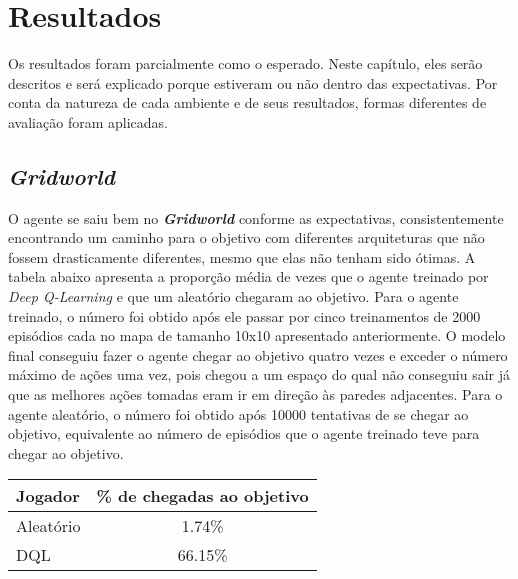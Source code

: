
\chapter{Resultados}
\label{cap:resultados}

Os resultados foram parcialmente como o esperado.
Neste capítulo, eles serão descritos e será explicado porque estiveram ou não dentro das expectativas.
Por conta da natureza de cada ambiente e de seus resultados, formas diferentes de avaliação foram aplicadas.

\section{\textit{Gridworld}}
\label{sec:res_gridworld}

O agente se saiu bem no \textbf{\textit{Gridworld}} conforme as expectativas, consistentemente encontrando um caminho para o objetivo com diferentes arquiteturas que não fossem drasticamente diferentes, mesmo que elas não tenham sido ótimas.
A tabela abaixo apresenta a proporção média de vezes que o agente treinado por \textit{Deep Q-Learning} e que um aleatório chegaram ao objetivo.
Para o agente treinado, o número foi obtido após ele passar por cinco treinamentos de 2000 episódios cada no mapa de tamanho 10x10 apresentado anteriormente.
O modelo final conseguiu fazer o agente chegar ao objetivo quatro vezes e exceder o número máximo de ações uma vez, pois chegou a um espaço do qual não conseguiu sair já que as melhores ações tomadas eram ir em direção às paredes adjacentes.
Para o agente aleatório, o número foi obtido após 10000 tentativas de se chegar ao objetivo, equivalente ao número de episódios que o agente treinado teve para chegar ao objetivo.

\begin{center}
\begin{tabular}{l c}
\hline
Jogador & \% de chegadas ao objetivo \\
\hline
Aleatório & 1.74\% \\
DQL & 66.15\% \\
\hline
\end{tabular}
\label{table:gridworld_score}
\end{center}

